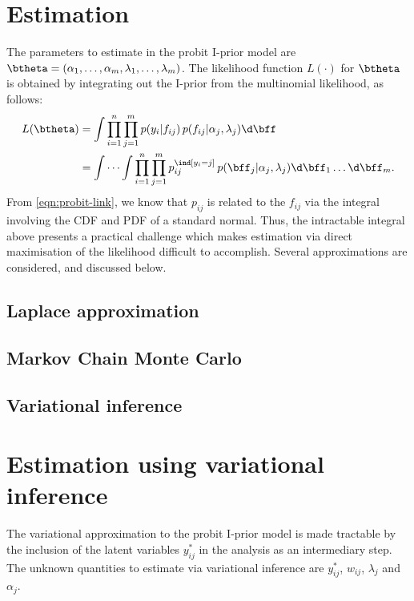 \documentclass[]{article}
\begin{document}
\section{Estimation}

The parameters to estimate in the probit I-prior model are $\btheta = (\alpha_1, \dots, \alpha_m, \lambda_1, \dots, \lambda_m)$. The likelihood function $L(\cdot)$ for $\btheta$ is obtained by integrating out the I-prior from the multinomial likelihood, as follows:
\begin{align*}
  L(\btheta) 
  &= \int \prod_{i=1}^n \prod_{j=1}^m p(y_i | f_{ij} ) \, p(f_{ij}|\alpha_j, \lambda_j) \d \bff \\
  &= \idotsint \prod_{i=1}^n \prod_{j=1}^m p_{ij}^{\ind[y_i = j]} \, p(\bff_j | \alpha_j, \lambda_j) \d \bff_1 \dots \d \bff_m .
\end{align*}
From \eqref{eqn:probit-link}, we know that $p_{ij}$ is related to the $f_{ij}$ via the integral involving the CDF and PDF of a standard normal. Thus, the intractable integral above presents a practical challenge which makes estimation via direct maximisation of the likelihood difficult to accomplish. Several approximations are considered, and discussed below.

\subsection{Laplace approximation}


\subsection{Markov Chain Monte Carlo}


\subsection{Variational inference}


\section{Estimation using variational inference}

The variational approximation to the probit I-prior model is made tractable by the inclusion of the latent variables $y_{ij}^*$ in the analysis as an intermediary step. The unknown quantities to estimate via variational inference are $y_{ij}^*$, $w_{ij}$, $\lambda_j$ and $\alpha_j$.
\end{document}
